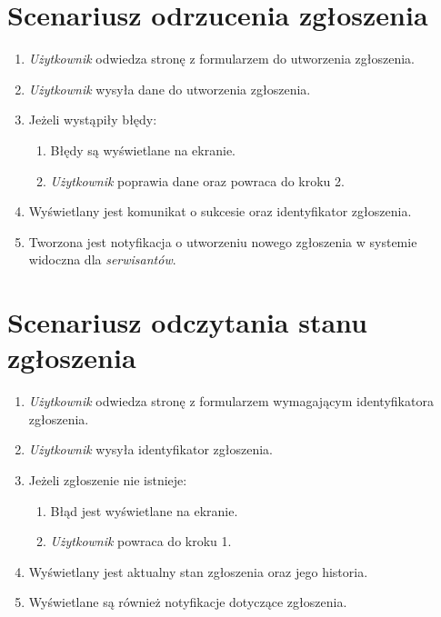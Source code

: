 \documentclass[11pt,a4paper]{article}
\begin{document}
\section{Scenariusz odrzucenia zgłoszenia}
\begin{enumerate}
\item{\textit{Użytkownik} odwiedza stronę z formularzem do utworzenia zgłoszenia.}
\item{\textit{Użytkownik} wysyła dane do utworzenia zgłoszenia.}
\item{Jeżeli wystąpiły błędy:}
\begin{enumerate}
\item{Błędy są wyświetlane na ekranie.}
\item{\textit{Użytkownik} poprawia dane oraz powraca do kroku 2.}
\end{enumerate}
\item{Wyświetlany jest komunikat o sukcesie oraz identyfikator zgłoszenia.}
\item{Tworzona jest notyfikacja o utworzeniu nowego zgłoszenia w systemie widoczna dla \textit{serwisantów}.}
\end{enumerate}

\bigskip

\section{Scenariusz odczytania stanu zgłoszenia}
\begin{enumerate}
\item{\textit{Użytkownik} odwiedza stronę z formularzem wymagającym identyfikatora zgłoszenia.}
\item{\textit{Użytkownik} wysyła identyfikator zgłoszenia.}
\item{Jeżeli zgłoszenie nie istnieje:}
\begin{enumerate}
\item{Błąd jest wyświetlane na ekranie.}
\item{\textit{Użytkownik} powraca do kroku 1.}
\end{enumerate}
\item{Wyświetlany jest aktualny stan zgłoszenia oraz jego historia.}
\item{Wyświetlane są również notyfikacje dotyczące zgłoszenia.}
\end{enumerate}
\end{document}
